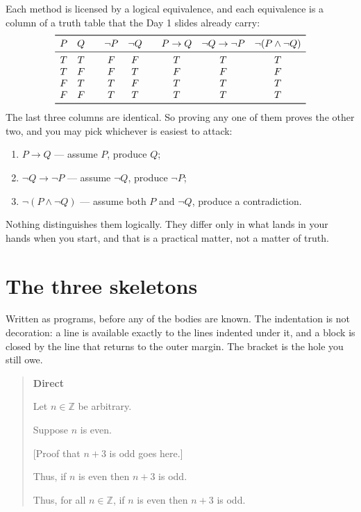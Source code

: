 \documentclass[12pt]{article}
\begin{document}
Each method is licensed by a logical equivalence, and each equivalence is a
column of a truth table that the Day 1 slides already carry:
\[
\begin{array}{cc@{\qquad}cc@{\qquad}ccc}
\toprule
P & Q & \lnot P & \lnot Q &
P\rightarrow Q & \lnot Q\rightarrow\lnot P & \lnot(P\land\lnot Q)\\
\midrule
T & T & F & F & T & T & T\\
T & F & F & T & F & F & F\\
F & T & T & F & T & T & T\\
F & F & T & T & T & T & T\\
\bottomrule
\end{array}
\]
The last three columns are identical. So proving any one of them proves the
other two, and you may pick whichever is easiest to attack:
\begin{enumerate}[label=(\arabic*),leftmargin=2.4em,topsep=.3em,itemsep=.2em]
  \item $P\rightarrow Q$ --- assume $P$, produce $Q$;
  \item $\lnot Q\rightarrow\lnot P$ --- assume $\lnot Q$, produce $\lnot P$;
  \item $\lnot(P\land\lnot Q)$ --- assume both $P$ and $\lnot Q$, produce a
        contradiction.
\end{enumerate}
Nothing distinguishes them logically. They differ only in what lands in your
hands when you start, and that is a practical matter, not a matter of truth.

\section*{The three skeletons}

Written as programs, before any of the bodies are known. The indentation is not
decoration: a line is available exactly to the lines indented under it, and a
block is closed by the line that returns to the outer margin. The bracket is the
hole you still owe.

\begin{quote}
\textbf{Direct}\par
Let $n\in\mathbb{Z}$ be arbitrary.\par
\hspace*{2.25em}Suppose $n$ is even.\par
\hspace*{4.5em}[Proof that $n+3$ is odd goes here.]\par
\hspace*{2.25em}Thus, if $n$ is even then $n+3$ is odd.\par
Thus, for all $n\in\mathbb{Z}$, if $n$ is even then $n+3$ is odd.
\end{quote}
\end{document}
